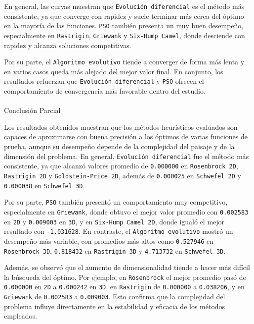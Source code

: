 \documentclass[
  12pt,
  letterpaper,
  DIV=11,
  numbers=noendperiod]{scrartcl}
\makeatletter
\let\oldparagraph\paragraph
\renewcommand{\paragraph}{
    \@ifstar
      \xxxParagraphStar
      \xxxParagraphNoStar
  }
\newcommand{\xxxParagraphStar}[1]{\oldparagraph*{#1}\mbox{}}
\newcommand{\xxxParagraphNoStar}[1]{\oldparagraph{#1}\mbox{}}
\makeatother
\begin{document}
En general, las curvas muestran que \texttt{Evolución\ diferencial} es
el método más consistente, ya que converge con rapidez y suele terminar
más cerca del óptimo en la mayoría de las funciones. \texttt{PSO}
también presenta un muy buen desempeño, especialmente en
\texttt{Rastrigin}, \texttt{Griewank} y \texttt{Six-Hump\ Camel}, donde
desciende con rapidez y alcanza soluciones competitivas.

Por su parte, el \texttt{Algoritmo\ evolutivo} tiende a converger de
forma más lenta y en varios casos queda más alejado del mejor valor
final. En conjunto, los resultados refuerzan que
\texttt{Evolución\ diferencial} y \texttt{PSO} ofrecen el comportamiento
de convergencia más favorable dentro del estudio.

\paragraph{Conclusión Parcial}\label{conclusiuxf3n-parcial-1}

Los resultados obtenidos muestran que los métodos heurísticos evaluados
son capaces de aproximarse con buena precisión a los óptimos de varias
funciones de prueba, aunque su desempeño depende de la complejidad del
paisaje y de la dimensión del problema. En general,
\texttt{Evolución\ diferencial} fue el método más consistente, ya que
alcanzó valores promedio de \texttt{0.000000} en
\texttt{Rosenbrock\ 2D}, \texttt{Rastrigin\ 2D} y
\texttt{Goldstein-Price\ 2D}, además de \texttt{0.000025} en
\texttt{Schwefel\ 2D} y \texttt{0.000038} en \texttt{Schwefel\ 3D}.

Por su parte, \texttt{PSO} también presentó un comportamiento muy
competitivo, especialmente en \texttt{Griewank}, donde obtuvo el mejor
valor promedio con \texttt{0.002583} en \texttt{2D} y \texttt{0.009003}
en \texttt{3D}, y en \texttt{Six-Hump\ Camel\ 2D}, donde igualó el mejor
resultado con \texttt{-1.031628}. En contraste, el
\texttt{Algoritmo\ evolutivo} mostró un desempeño más variable, con
promedios más altos como \texttt{0.527946} en \texttt{Rosenbrock\ 3D},
\texttt{0.818432} en \texttt{Rastrigin\ 3D} y \texttt{4.713732} en
\texttt{Schwefel\ 3D}.

Además, se observó que el aumento de dimensionalidad tiende a hacer más
difícil la búsqueda del óptimo. Por ejemplo, en \texttt{Rosenbrock} el
mejor promedio pasó de \texttt{0.000000} en \texttt{2D} a
\texttt{0.000242} en \texttt{3D}, en \texttt{Rastrigin} de
\texttt{0.000000} a \texttt{0.038206}, y en \texttt{Griewank} de
\texttt{0.002583} a \texttt{0.009003}. Esto confirma que la complejidad
del problema influye directamente en la estabilidad y eficacia de los
métodos empleados.
\end{document}

